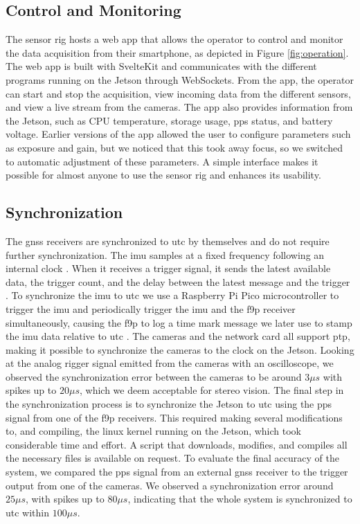 \subsection{Control and Monitoring}
The sensor rig hosts a web app that allows the operator to control and monitor the data acquisition from their smartphone, as depicted in Figure \ref{fig:operation}.
The web app is built with SvelteKit and communicates with the different programs running on the Jetson through WebSockets.
From the app, the operator can start and stop the acquisition, view incoming data from the different sensors, and view a live stream from the cameras.
The app also provides information from the Jetson, such as CPU temperature, storage usage, \gls{pps} status, and battery voltage.
Earlier versions of the app allowed the user to configure parameters such as exposure and gain, but we noticed that this took away focus, so we switched to automatic adjustment of these parameters.
A simple interface makes it possible for almost anyone to use the sensor rig and enhances its usability.


\subsection{Synchronization}
The \gls{gnss} receivers are synchronized to \gls{utc} by themselves and do not require further synchronization.
The \gls{imu} samples at a fixed frequency following an internal clock \cite{safranSTIM300Datasheet}.
When it receives a trigger signal, it sends the latest available data, the trigger count, and the delay between the latest message and the trigger \cite{safranSTIM300Datasheet}.
To synchronize the \gls{imu} to \gls{utc} we use a Raspberry Pi Pico microcontroller to trigger the \gls{imu} and periodically trigger the \gls{imu} and the \gls{f9p} receiver simultaneously, causing the \gls{f9p} to log a time mark message we later use to stamp the \gls{imu} data relative to \gls{utc} \cite[190]{u-bloxZEDF9PInterfaceDescription}.
The cameras and the network card all support \gls{ptp}, making it possible to synchronize the cameras to the clock on the Jetson.
Looking at the analog rigger signal emitted from the cameras with an oscilloscope, we observed the synchronization error between the cameras to be around $3\mu s$ with spikes up to $20\mu s$, which we deem acceptable for stereo vision.
The final step in the synchronization process is to synchronize the Jetson to \gls{utc} using the \gls{pps} signal from one of the \gls{f9p} receivers.
This required making several modifications to, and compiling, the linux kernel running on the Jetson, which took considerable time and effort.
A script that downloads, modifies, and compiles all the necessary files is available on request.
To evaluate the final accuracy of the system, we compared the \gls{pps} signal from an external \gls{gnss} receiver to the trigger output from one of the cameras. 
We observed a synchronization error around $25\mu s$, with spikes up to $80\mu s$, indicating that the whole system is synchronized to \gls{utc} within $100\mu s$.








